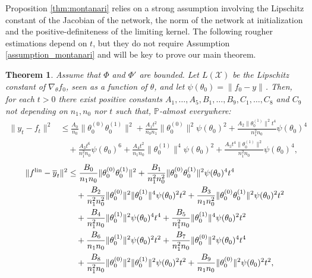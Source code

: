\documentclass{article}
\newtheorem{thm}{Theorem}[section]
\theoremstyle{definition}
\theoremstyle{remark}
\numberwithin{equation}{section}
\newcommand{\X}{\mathcal{X}}
\newcommand{\s}{\psi}
\newcommand{\lin}{{\textup{lin}}}
\newcommand{\norm}[2]{
    \|#1\|_{#2}
}
\begin{document}
Proposition \ref{thm:montanari} relies on a strong assumption involving the Lipschitz constant of the Jacobian of the network, 
the norm of the network at initialization and the positive-definiteness of the limiting kernel.
The following rougher estimations depend on $t$, but they do not require Assumption \ref{assumption_montanari} and will be key to prove our main theorem.

\begin{thm}
    \label{thm:stime_polinomiali}
    Assume that $\Phi$ and $\Phi'$ are bounded.
    Let $L(\X)$ be the Lipschitz constant of $\nabla_\theta f_0$, seen as a function of $\theta$,
    and let $\s(\theta_0) = \norm{f_0-y}{}$.
    Then, for each $t > 0$ there exist positive constants $A_1, \ldots, A_5,B_1, \ldots, B_9,C_1, \ldots, C_8$ and $C_9$ not depending on $n_1, n_0$ nor $t$ such that, $\mathbb P$-almost everywhere:
    \begin{align}
        \norm{y_t- f_t}{}^2 &\le \frac{A_0}{n_0}\norm{\theta^{(0)}_0\theta^{(1)}_0}{}^2 +\frac{A_1t^2}{n_0n_1}\norm{\theta^{(0)}_0}{}^2\s(\theta_0)^2 + \frac{A_2\norm{\theta^{(1)}_0}{}^2t^4}{n_1^2n_0}\s(\theta_0)^4 \\
        &\quad + \frac{A_3t^6}{n_1^2n_0}\s(\theta_0)^6 + \frac{A_4t^2}{n_1n_0}\norm{\theta^{(1)}_0}{}^4\s(\theta_0)^2 + \frac{A_5t^4\norm{\theta^{(1)}_0}{}^2}{n_1^2n_0}\s(\theta_0)^4,
    \end{align}
    \begin{align}
        \norm{f^\lin-\overline y_t}{}^2 &\le \frac{B_0}{n_1n_0}\norm{\theta_0^{(0)}\theta_0^{(1)} }{}^2 + \frac{B_1}{n_1^2n_0^2}\norm{\theta_0^{(0)}\theta_0^{(1)} }{}^2\s(\theta_0)^4t^4\\
        &\quad +\frac{B_2}{n_1^2n_0^2}\norm{\theta_0^{(0)}}{}^2\norm{\theta_0^{(1)} }{}^4\s(\theta_0)^2t^2+\frac{B_3}{n_1n_0^2}\norm{\theta_0^{(0)}\theta_0^{(1)} }{}^2\s(\theta_0)^2 t^2\\
        &\quad +\frac{B_4}{n_1^2n_0}\norm{\theta_0^{(1)} }{}^2\s(\theta_0)^4t^4+\frac{B_5}{n_1^2n_0}\norm{\theta_0^{(1)} }{}^4\s(\theta_0)^2t^2 \\
        &\quad +\frac{B_6}{n_1n_0}\norm{\theta_0^{(1)} }{}^2\s(\theta_0)^2t^2+\frac{B_7}{n_1^2n_0}\norm{\theta_0^{(0)} }{}^2\s(\theta_0)^4t^4 \\
        &\quad +\frac{B_8}{n_1^2n_0}\norm{\theta_0^{(0)} }{}^2\norm{\theta_0^{(1)} }{}^2\s(\theta_0)^2t^2+\frac{B_9}{n_1n_0}\norm{\theta_0^{(0)} }{}^2\s(\theta_0)^2t^2,
    \end{align}
    \begin{align}

\end{align}
\end{thm}
\end{document}
